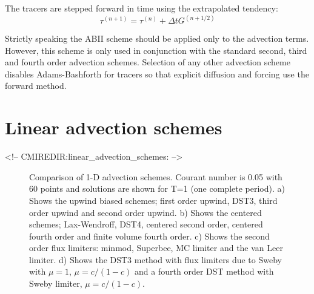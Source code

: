 The tracers are stepped forward in time using the extrapolated tendency:
\begin{equation}
\tau^{(n+1)} = \tau^{(n)} + \Delta t G^{(n+1/2)}
\end{equation}


Strictly speaking the ABII scheme should be applied only to the
advection terms. However, this scheme is only used in conjunction with
the standard second, third and fourth order advection
schemes. Selection of any other advection scheme disables
Adams-Bashforth for tracers so that explicit diffusion and forcing use
the forward method.




\section{Linear advection schemes}
\label{sect:tracer-advection}
\begin{rawhtml}
<!-- CMIREDIR:linear_advection_schemes: -->
\end{rawhtml}

\begin{figure}
\caption{
Comparison of 1-D advection schemes. Courant number is 0.05 with 60
points and solutions are shown for T=1 (one complete period).
a) Shows the upwind biased schemes; first order upwind, DST3,
third order upwind and second order upwind.
b) Shows the centered schemes; Lax-Wendroff, DST4, centered second order,
centered fourth order and finite volume fourth order.
c) Shows the second order flux limiters: minmod, Superbee,
MC limiter and the van Leer limiter.
d) Shows the DST3 method with flux limiters due to Sweby with
$\mu=1$, $\mu=c/(1-c)$ and a fourth order DST method with Sweby limiter,
$\mu=c/(1-c)$.
\label{fig:advect-1d-lo}
}
\end{figure}

